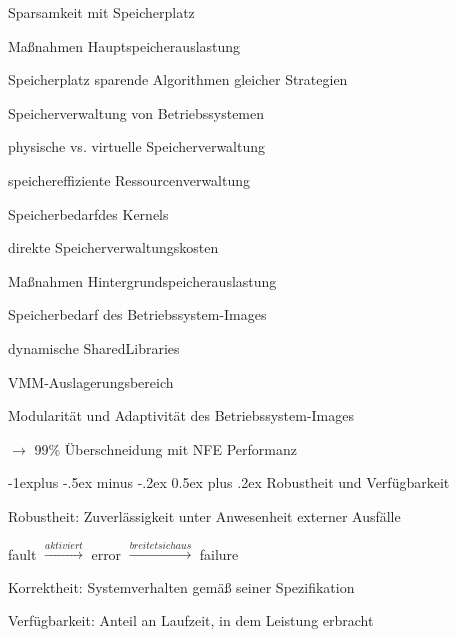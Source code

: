 \documentclass[a4paper]{article}
\makeatletter
\renewcommand{\subsection}{\@startsection{subsection}{2}{0mm}%
 {-1explus -.5ex minus -.2ex}%
 {0.5ex plus .2ex}%
 {\normalfont\normalsize\bfseries}}
\makeatother
\begin{document}
\begin{multicols}{3}
    Sparsamkeit mit Speicherplatz
    \begin{itemize*}
        \item Maßnahmen Hauptspeicherauslastung
        \begin{enumerate*}
            \item Speicherplatz sparende Algorithmen gleicher Strategien
            \item Speicherverwaltung von Betriebssystemen
            \begin{itemize*}
                \item physische vs. virtuelle Speicherverwaltung
                \item speichereffiziente Ressourcenverwaltung
                \item Speicherbedarfdes Kernels
                \item direkte Speicherverwaltungskosten
            \end{itemize*}
        \end{enumerate*}
        \item Maßnahmen Hintergrundspeicherauslastung
        \begin{enumerate*}
            \item Speicherbedarf des Betriebssystem-Images
            \item dynamische SharedLibraries
            \item VMM-Auslagerungsbereich
            \item Modularität und Adaptivität des Betriebssystem-Images
        \end{enumerate*}
        $\rightarrow$ 99\% Überschneidung mit NFE Performanz
    \end{itemize*}

    \subsection{Robustheit und Verfügbarkeit}
    \begin{itemize*}
        \item Robustheit: Zuverlässigkeit unter Anwesenheit externer Ausfälle
        \item fault $\xrightarrow{aktiviert}$ error $\xrightarrow{breitet sich aus}$ failure
        \item Korrektheit: Systemverhalten gemäß seiner Spezifikation
        \item Verfügbarkeit: Anteil an Laufzeit, in dem Leistung erbracht
    \end{itemize*}


\end{multicols}
\end{document}
